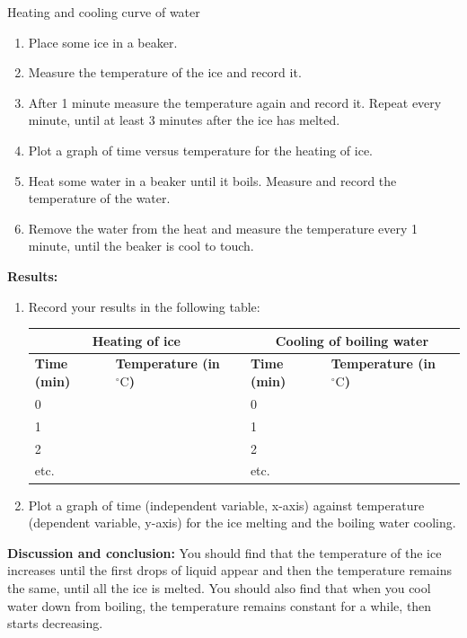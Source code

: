\begin{f_experiment}{Heating and cooling curve of water}
{\label{m38736*id9872}\begin{enumerate}[noitemsep, label=\textbf{\arabic*}.]
            \item Place some ice in a beaker.
\item Measure the temperature of the ice and record it.
\item After 1 minute measure the temperature again and record it. Repeat every minute, until at least 3 minutes after the ice has melted.
\item Plot a graph of time versus temperature for the heating of ice.
\item Heat some water in a beaker until it boils. Measure and record the temperature of the water.
\item Remove the water from the heat and measure the temperature every 1 minute, until the beaker is cool to touch.
\end{enumerate}
      \label{m38736*eip-863}\noindent{}\textbf{Results: }
\begin{enumerate}[noitemsep, label=\textbf{\arabic*}.]
\item Record your results in the following table: 
          \begin{table}[H]
        \begin{center}
      \label{m38736*uid434}
    \noindent
      \begin{tabular}{|l|l|l|l|}\hline
\multicolumn{2}{|c|}{Heating of ice} & \multicolumn{2}{c|}{Cooling of boiling water}  \\ \hline
 \textbf{Time (min)} & \textbf{Temperature (in $^{\circ} \text{C}$)} &  \textbf{Time (min)} & \textbf{Temperature (in $^{\circ} \text{C}$)} \\ \hline
     0    & & 0    & \\ \hline 
     1    & & 1    & \\ \hline
     2    & & 2    & \\ \hline
     etc. & & etc. & \\ \hline
    \end{tabular}
      \end{center}
\end{table}
\item Plot a graph of time (independent variable, x-axis) against temperature (dependent variable, y-axis) for the ice melting and the boiling water cooling. 
\end{enumerate}
\noindent{}\textbf{Discussion and conclusion: } You should find that the temperature of the ice increases until the first drops of liquid appear and then the temperature remains the same, until all the ice is melted. You should also find that when you cool water down from boiling, the temperature remains constant for a while, then starts decreasing.}
\end{f_experiment} 
